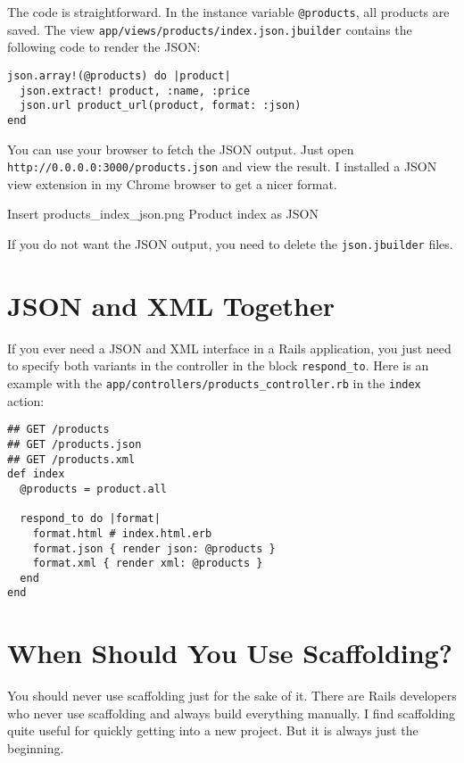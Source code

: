 \documentclass[a4paper]{book}
\begin{document}
The code is straightforward. In the instance variable \texttt{@products}, all products are saved. The view \texttt{app/views/products/index.json.jbuilder} contains the following code to render the JSON:

\begin{shaded}\begin{verbatim}
json.array!(@products) do |product|
  json.extract! product, :name, :price
  json.url product_url(product, format: :json)
end
\end{verbatim}\end{shaded}

You can use your browser to fetch the JSON output. Just open \texttt{http://0.0.0.0:3000/products.json} and view the result. I installed a JSON view extension in my Chrome browser to get a nicer format.

Insert products\_index\_json.png Product index as JSON

If you do not want the JSON output, you need to delete the \texttt{json.jbuilder} files.

\section{JSON and XML Together}\label{json-and-xml-together}

If you ever need a JSON and XML interface in a Rails application, you just need to specify both variants in the controller in the block \texttt{respond\_to}. Here is an example with the \texttt{app/controllers/products\_controller.rb} in the \texttt{index} action:

\begin{shaded}\begin{verbatim}
## GET /products
## GET /products.json
## GET /products.xml
def index
  @products = product.all

  respond_to do |format|
    format.html # index.html.erb
    format.json { render json: @products }
    format.xml { render xml: @products }
  end
end
\end{verbatim}\end{shaded}

\section{When Should You Use Scaffolding?}\label{when-should-you-use-scaffolding}

You should never use scaffolding just for the sake of it. There are Rails developers who never use scaffolding and always build everything manually. I find scaffolding quite useful for quickly getting into a new project. But it is always just the beginning.
\end{document}
